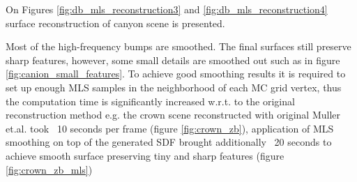 On Figures \ref{fig:db_mls_reconstruction3} and \ref{fig:db_mls_reconstruction4} surface reconstruction of canyon scene is presented.

Most of the high-frequency bumps are smoothed. The final surfaces still preserve sharp features, however, some small details are smoothed out such as in figure \ref{fig:canion_small_features}. To achieve good smoothing results it is required to set up enough MLS samples in the neighborhood of each MC grid vertex, thus the computation time is significantly increased w.r.t. to the original reconstruction method e.g. the crown scene reconstructed with original Muller et.al. took ~10 seconds per frame (figure \ref{fig:crown_zb}), application of MLS smoothing on top of the generated SDF brought additionally ~20 seconds to achieve smooth surface preserving tiny and sharp features (figure \ref{fig:crown_zb_mls}) 

